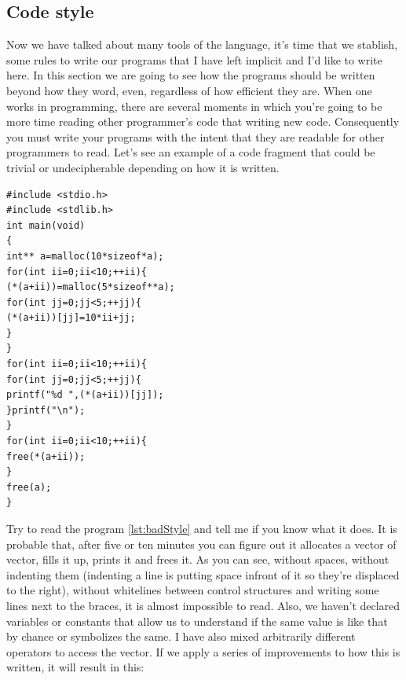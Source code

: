 \documentclass[a4paper]{article}
\begin{document}
\subsection{Code style}
Now we have talked about many tools of the language, it's time that we stablish,
some rules to write our programs that I have left implicit and I'd like to write
here. In this section we are going to see how the programs should be written
beyond how they word, even, regardless of how efficient they are. When one works
in programming, there are several moments in which you're going to be more time
reading other programmer's code that writing new code. Consequently you must
write your programs with the intent that they are readable for other programmers
to read. Let's see an example of a code fragment that could be trivial or
undecipherable depending on how it is written.

\noindent
\begin{minipage}[H]{\linewidth}
\mbox{}
\begin{lstlisting}[style=C,
caption={Example of a program with a bad style},
label={lst:badStyle}]
#include <stdio.h>
#include <stdlib.h>
int main(void)
{
int** a=malloc(10*sizeof*a);
for(int ii=0;ii<10;++ii){
(*(a+ii))=malloc(5*sizeof**a);
for(int jj=0;jj<5;++jj){
(*(a+ii))[jj]=10*ii+jj;
}
}
for(int ii=0;ii<10;++ii){
for(int jj=0;jj<5;++jj){
printf("%d ",(*(a+ii))[jj]);
}printf("\n");
}
for(int ii=0;ii<10;++ii){
free(*(a+ii));
}
free(a);
}
\end{lstlisting}
\end{minipage}

Try to read the program \ref{lst:badStyle} and tell me if you know what it does.
It is probable that, after five or ten minutes you can figure out it allocates
a vector of vector, fills it up, prints it and frees it. As you can see, without
spaces, without indenting them (indenting a line is putting space infront of it
so they're displaced to the right), without whitelines between control
structures and writing some lines next to the braces, it is almost impossible
to read. Also, we haven't declared variables or constants that allow us to
understand if the same value is like that by chance or symbolizes the same.
I have also mixed arbitrarily different operators to access the vector. If
we apply a series of improvements to how this is written, it will result in
this:
\end{document}
